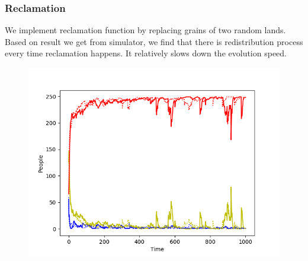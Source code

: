 \subsubsection{Reclamation}
We implement reclamation function by replacing grains of two random lands. Based on result we get from simulator, we find that there is redistribution process every time reclamation happens. It relatively slows down the evolution speed.
\begin{figure}[H]
	\begin{center}
		\includegraphics[scale= 0.6]{reclamation.png}
	\end{center}
\end{figure}

